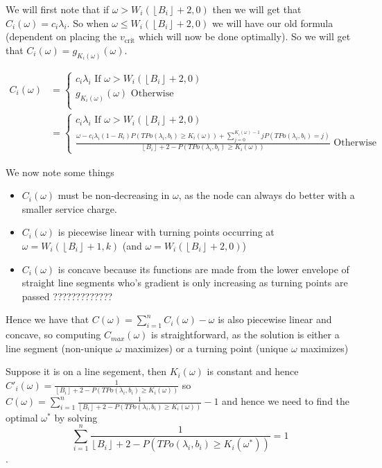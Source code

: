 \documentclass[a4paper,10pt]{article}
\newcommand{\floor}[1]{\left \lfloor #1 \right \rfloor}
\theoremstyle{definition}
\theoremstyle{definition}
\theoremstyle{remark}
\theoremstyle{definition}
\begin{document}
We will first note that if $\omega > W_{i}(\floor{B_{i}}+2,0)$ then we will get that $C_{i}(\omega)= c_{i} \lambda_{i}$. So when $\omega \leq W_{i}(\floor{B_{i}}+2,0)$ we will have our old formula (dependent on placing the $v_{\text{crit}}$ which will now be done optimally). So we will get that $C_{i}(\omega)=g_{K_{i}(\omega)}(\omega)$.

\begin{align}
C_{i}(\omega)&=\begin{cases}
c_{i} \lambda_{i} \text{ If } \omega > W_{i}(\floor{B_{i}}+2,0) \\
g_{K_{i}(\omega)}(\omega) \text{ Otherwise} \\ 
\end{cases} \\
&= \begin{cases}
c_{i} \lambda_{i} \text{ If } \omega > W_{i}(\floor{B_{i}}+2,0) \\
\frac{\omega - c_{i} \lambda_{i} (1-R_{i}) P(TPo(\lambda_{i},b_{i}) \geq K_{i}(\omega)) +  \sum\limits_{j=0}^{K_{i}(\omega)-1} j P(TPo(\lambda_{i},b_{i})=j)}{\floor{B_{i}}+2-P(TPo(\lambda_{i},b_{i}) \geq K_{i}(\omega))} \text{ Otherwise}
\end{cases}
\end{align}

We now note some things

\begin{itemize}
\item $C_{i}(\omega)$ must be non-decreasing in $\omega$, as the node can always do better with a smaller service charge.

\item $C_{i}(\omega)$ is piecewise linear with turning points occurring at $\omega=W_{i}(\floor{B_{i}}+1,k)$ (and $\omega=W_{i}(\floor{B_{i}}+2,0)$)

\item $C_{i}(\omega)$ is concave because its functions are made from the lower envelope of straight line segments who's gradient is only increasing as turning points are passed ?????????????
\end{itemize}

Hence we have that $C(\omega)=\sum\limits_{i=1}^{n} C_{i}(\omega) -\omega$ is also piecewise linear and concave, so computing $C_{max}(\omega)$ is straightforward, as the solution is either a line segment (non-unique $\omega$ maximizes) or a turning point (unique $\omega$ maximizes)

Suppose it is on a line segement, then $K_{i}(\omega)$ is constant and hence $C'_{i}(\omega)=\frac{1}{\floor{B_{i}}+2-P(TPo(\lambda_{i},b_{i}) \geq K_{i}(\omega))}$ so $C(\omega)=\sum\limits_{i=1}^{n} \frac{1}{\floor{B_{i}}+2-P(TPo(\lambda_{i},b_{i}) \geq K_{i}(\omega))} -1$ and hence we need to find the optimal $\omega^{*}$ by solving 
$$\sum\limits_{i=1}^{n} \frac{1}{\floor{B_{i}}+2-P(TPo(\lambda_{i},b_{i}) \geq K_{i}(\omega^{*}))} =1 $$.
\end{document}
